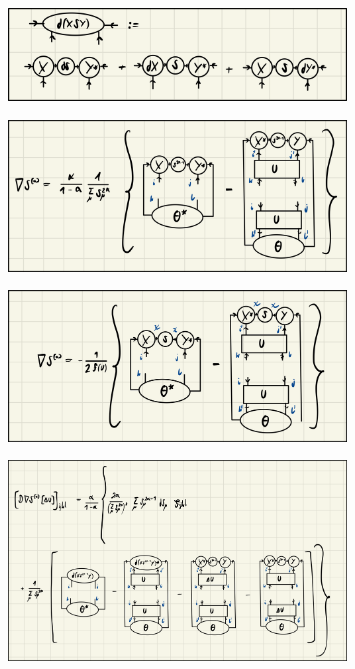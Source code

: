 \begin{figure}
	\centering
	\includegraphics[width=0.8\textwidth]{figures/appendix_C/svd_derivative.jpeg}
	\caption{}
	\label{fig:svd_derivative}
\end{figure}
\begin{figure}
	\centering
	\includegraphics[width=0.8\textwidth]{figures/appendix_C/gradient_renyi_alpha_entropy.jpeg}
	\caption{}
	\label{fig:gradient_renyi_entropy}
\end{figure}
\begin{figure}
	\centering
	\includegraphics[width=0.8\textwidth]{figures/appendix_C/gradient_truncation_error.jpeg}
	\caption{}
	\label{fig:gradient_truncation_error}
\end{figure}
\begin{figure}
	\centering
	\includegraphics[width=0.8\textwidth]{figures/appendix_C/hvp_renyi_alpha_entropy.jpeg}
	\caption{}
	\label{fig:hvp_renyi_entropy}
\end{figure}
